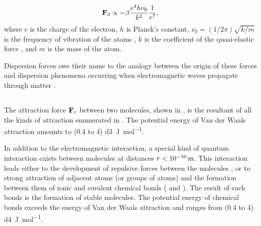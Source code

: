 \begin{enumerate}[label=(\alph*),noitemsep,nolistsep]
\begin{equation*}%
\vb{F}_{d} \propto - \beta \frac{e^{4}h\nu_{0}}{k^{2}} \frac{1}{r^{7}},
\end{equation*}
where $e$ is the charge of the electron, $h$ is Planck's constant,
$\nu_{0}= (1/2\pi) \sqrt{k/m}$ is the frequency of vibration of the atoms , $k$ is the coefficient of the quasi-elastic force , and $m$ is the mass of the atom.
\end{enumerate}
Dispersion forces owe their name to the analogy between the origin of these forces and dispersion phenomena occurring when electromagnetic waves propagate through matter .


\subsection{}\label{12.1.9} The attraction force $\vb{F}_{r}$ between two molecules, shown in , is the resultant of all the kinds of attraction enumerated in . The potential energy of Van der Waals attraction amounts to (0.4 to 4) \times \SI{d3}{\joule\per\mole}.

In addition to the electromagnetic interaction, a special kind of quantum interaction exists between molecules at distances $r < \SI{d-10}{\meter}	$. This interaction leads either to the development of repulsive forces between the molecules , or to strong attraction of adjacent atoms (or groups of atoms) and the for­mation between them of ionic and covalent chemical bonds ( and ). The result of such bonds is the formation of stable molecules. The potential energy of chemical bonds exceeds the energy of Van der Waals attraction and ranges from (0.4 to 4) \times \SI{d4}{\joule\per\mole}.

